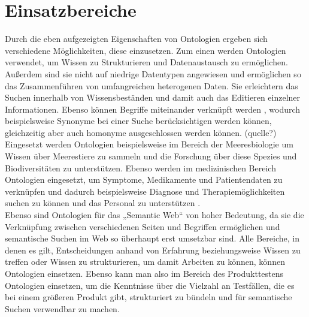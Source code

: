 \section{Einsatzbereiche}
Durch die eben aufgezeigten Eigenschaften von Ontologien ergeben sich verschiedene Möglichkeiten, diese einzusetzen. Zum einen werden Ontologien verwendet, um Wissen zu Strukturieren und Datenaustausch zu ermöglichen. Außerdem sind sie nicht auf niedrige Datentypen angewiesen und ermöglichen so das Zusammenführen von umfangreichen heterogenen Daten. Sie erleichtern das Suchen innerhalb von Wissensbeständen und damit auch das Editieren einzelner Informationen. Ebenso können Begriffe miteinander verknüpft werden \cite{BernersLee.2001}, wodurch beispielsweise Synonyme bei einer Suche berücksichtigen werden können, gleichzeitig aber auch homonyme ausgeschlossen werden können. (quelle?)
Eingesetzt werden Ontologien beispielsweise im Bereich der Meeresbiologie \cite{Garoufallou.2013} um Wissen über Meerestiere zu sammeln und die Forschung über diese Spezies und Biodiversitäten zu unterstützen. Ebenso werden im medizinischen Bereich Ontologien eingesetzt, um Symptome, Medikamente und Patientendaten zu verknüpfen und dadurch beispielsweise Diagnose und Therapiemöglichkeiten suchen zu können und das Personal zu unterstützen \cite{WolfgangHesse.2005}.\\

Ebenso sind Ontologien für das „Semantic Web“ von hoher Bedeutung, da sie die Verknüpfung zwischen verschiedenen Seiten und Begriffen ermöglichen \cite{BernersLee.2001} und semantische Suchen im Web so überhaupt erst umsetzbar sind. \newline
Alle Bereiche, in denen es gilt, Entscheidungen anhand von Erfahrung beziehungsweise Wissen zu treffen oder Wissen zu strukturieren, um damit Arbeiten zu können, können Ontologien einsetzen.\newline
Ebenso kann man also im Bereich des Produkttestens Ontologien einsetzen, um die Kenntnisse über die Vielzahl an Testfällen, die es bei einem größeren Produkt gibt, strukturiert zu bündeln und für semantische Suchen verwendbar zu machen. 
